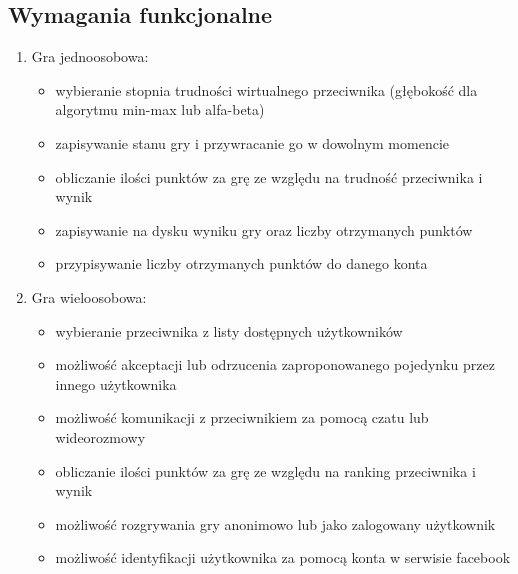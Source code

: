 \documentclass[12pt]{article}
\begin{document}
\subsection{Wymagania funkcjonalne}
\begin{enumerate}
\item Gra jednoosobowa:
\begin{itemize}
\item wybieranie stopnia trudności wirtualnego przeciwnika (głębokość dla algorytmu min-max lub alfa-beta)
\item zapisywanie stanu gry i przywracanie go w dowolnym momencie
\item obliczanie ilości punktów za grę ze względu na trudność przeciwnika i wynik
\item zapisywanie na dysku wyniku gry oraz liczby otrzymanych punktów 
\item przypisywanie liczby otrzymanych punktów do danego konta
\end{itemize}

\item Gra wieloosobowa:
\begin{itemize}
\item wybieranie przeciwnika z listy dostępnych użytkowników
\item możliwość akceptacji lub odrzucenia zaproponowanego pojedynku przez innego użytkownika  
\item możliwość komunikacji z przeciwnikiem za pomocą czatu lub wideorozmowy
\item obliczanie ilości punktów za grę ze względu na ranking przeciwnika i wynik
\item możliwość rozgrywania gry anonimowo lub jako zalogowany użytkownik
\item możliwość identyfikacji użytkownika za pomocą konta w serwisie facebook
\end{itemize}
\end{enumerate}
\end{document}

